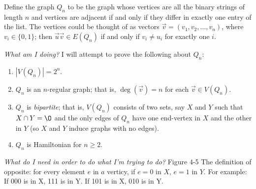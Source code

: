 \documentclass[12pt]{article}
\newenvironment{sub}[2][Sub-Experience]{\begin{trivlist}
\item[\hskip \labelsep {\bfseries #1}\hskip \labelsep {\bfseries #2.}]}{\end{trivlist}}
\begin{document}
\begin{sub}{2. The Binary Address Graph}Define the graph $Q_n$ to be the graph whose vertices are all the binary strings of length $n$ and vertices
are adjacent if and only if they differ in exactly one entry of the list.  The vertices could be thought of as vectors $\vec{v} = (v_1,v_2, \dots, v_n)$, where
$v_i \in \{0,1\}$; then $\vec{u}\vec{v} \in E(Q_n)$ if and only if $v_i \neq u_i$ for exactly one $i$. 

\end{sub}

\textit{What am I doing?}\newline
I will attempt to prove the following about $Q_n$: 

\begin{enumerate}
\item $|V(Q_n)| = 2^n$.

\item $Q_n$ is an $n$-regular graph; that is, $\deg(\vec{v}) = n$ for each $\vec{v} \in V(Q_n)$.

\item $Q_n$ is \emph{bipartite}; that is, $V(Q_n)$ consists of two sets, say $X$ and $Y$ such that $X \cap Y = \O$ and the only edges of
$Q_n$ have one end-vertex in $X$ and the other in $Y$ (so $X$ and $Y$ induce graphs with no edges).

\item $Q_n$ is Hamiltonian for $n \geq 2$.
\end{enumerate}

\textit{What do I need in order to do what I'm trying to do?}\newline 
Figure 4-5\newline
The definition of opposite: for every element $e$ in $a$ verticy, if $e = 0$ in $X$, $e = 1$ in $Y$. For example: If 000 is in X, 111 is in Y. If 101 is in X, 010 is in Y.\newline
\end{document}
